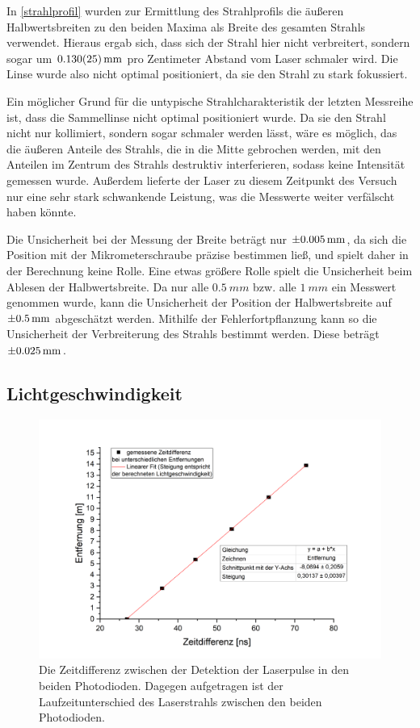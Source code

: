 \documentclass[
	a4paper,
	12pt,
	pagesize,
	ngerman
]{scrartcl}
\begin{document}
In \cref{strahlprofil} wurden zur Ermittlung des Strahlprofils die äußeren Halbwertsbreiten zu den beiden Maxima als Breite des gesamten Strahls verwendet. Hieraus ergab sich, dass sich der Strahl hier nicht verbreitert, sondern sogar um $\SI{0,130\pm0,025}{mm}$ pro Zentimeter Abstand vom Laser schmaler wird. Die Linse wurde also nicht optimal positioniert, da sie den Strahl zu stark fokussiert.

Ein möglicher Grund für die untypische Strahlcharakteristik der letzten Messreihe ist, dass die Sammellinse nicht optimal positioniert wurde. Da sie den Strahl nicht nur kollimiert, sondern sogar schmaler werden lässt, wäre es möglich, das die äußeren Anteile des Strahls, die in die Mitte gebrochen werden, mit den Anteilen im Zentrum des Strahls destruktiv interferieren, sodass keine Intensität gemessen wurde. Außerdem lieferte der Laser zu diesem Zeitpunkt des Versuch nur eine sehr stark schwankende Leistung, was die Messwerte weiter verfälscht haben könnte.

Die Unsicherheit bei der Messung der Breite beträgt nur $\SI{\pm0,005}{mm}$, da sich die Position mit der Mikrometerschraube präzise bestimmen ließ, und spielt daher in der Berechnung keine Rolle. Eine etwas größere Rolle spielt die Unsicherheit beim Ablesen der Halbwertsbreite. Da nur alle $\SI{0,5}{mm}$ bzw. alle $\SI{1}{mm}$ ein Messwert genommen wurde, kann die Unsicherheit der Position der Halbwertsbreite auf $\SI{\pm0,5}{mm}$ abgeschätzt werden. Mithilfe der Fehlerfortpflanzung kann so die Unsicherheit der Verbreiterung des Strahls bestimmt werden. Diese beträgt $\SI{\pm0,025}{mm}$.

\subsection{Lichtgeschwindigkeit}

\begin{figure}[ht!]
	\centering
	\includegraphics[scale=0.6]{lichtgeschwindigkeit.png}
	\caption{Die Zeitdifferenz zwischen der Detektion der Laserpulse in den beiden Photodioden. Dagegen aufgetragen ist der Laufzeitunterschied des Laserstrahls zwischen den beiden Photodioden.}
	\label{lichtgeschwindigkeit}
\end{figure}
\end{document}
